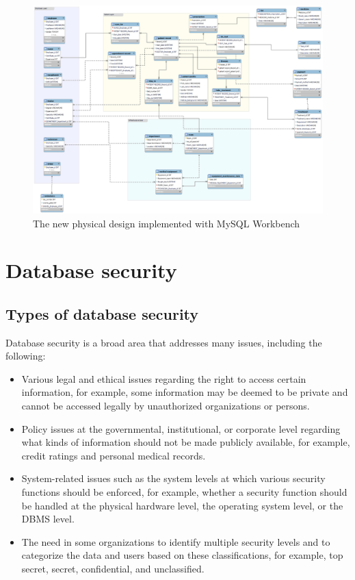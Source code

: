 \documentclass[a4paper]{article}
\numberwithin{equation}{section}
\begin{document}
\newpage
\begin{figure}[H]
    \centering
    \includegraphics[width = 12cm]{assets/New_logcial_design.png}
    \captionsetup{justification=centering,margin=2cm}
    \caption{The new physical design implemented with MySQL Workbench}
\end{figure}

\pagebreak



\section{Database security}
\subsection{Types of database security}
Database security is a broad area that addresses many issues, including the following:
\begin{itemize}
    \item  Various legal and ethical issues regarding the right to access certain information, for example, some information may be deemed to be private and cannot be accessed legally by unauthorized organizations or persons.
    \item Policy issues at the governmental, institutional, or corporate level regarding what kinds of information should not be made publicly available, for example, credit ratings and personal medical records.
    \item System-related issues such as the system levels at which various security functions should be enforced, for example, whether a security function should be handled at the physical hardware level, the operating system level, or the DBMS level.
    \item The need in some organizations to identify multiple security levels and to categorize the data and users based on these classifications, for example, top secret, secret, confidential, and unclassified.
\end{itemize}
\end{document}
